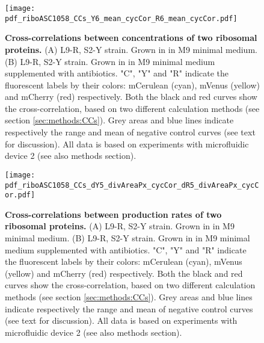 

\begin{figure}
    \centering
    \texttt{[image: pdf\_riboASC1058\_CCs\_Y6\_mean\_cycCor\_R6\_mean\_cycCor.pdf]}
    \caption{ 
        \textbf{Cross-correlations between concentrations of two ribosomal proteins.}
        (A) L9-R, S2-Y strain. Grown in in M9 minimal medium.
        (B) L9-R, S2-Y strain. Grown in in M9 minimal medium supplemented with antibiotics.
        "C", "Y" and "R" indicate the fluorescent labels by their colors: mCerulean (cyan), mVenus (yellow) and mCherry (red) respectively.
        Both the black and red curves show the cross-correlation, based on two different calculation methods (see section \ref{sec:methods:CCs}).
        Grey areas and blue lines indicate respectively the range and mean of negative control curves (see text for discussion).
        All data is based on experiments with microfluidic device 2 (see also methods section).
    }
    \label{fig:ribo:CCsEERiboribo}
\end{figure}

\begin{figure}
    \centering
    \texttt{[image: pdf\_riboASC1058\_CCs\_dY5\_divAreaPx\_cycCor\_dR5\_divAreaPx\_cycCor.pdf]}
    \caption{ 
        \textbf{Cross-correlations between production rates of two ribosomal proteins.}
        (A) L9-R, S2-Y strain. Grown in in M9 minimal medium.
        (B) L9-R, S2-Y strain. Grown in in M9 minimal medium supplemented with antibiotics.
        "C", "Y" and "R" indicate the fluorescent labels by their colors: mCerulean (cyan), mVenus (yellow) and mCherry (red) respectively.
        Both the black and red curves show the cross-correlation, based on two different calculation methods (see section \ref{sec:methods:CCs}).
        Grey areas and blue lines indicate respectively the range and mean of negative control curves (see text for discussion).
        All data is based on experiments with microfluidic device 2 (see also methods section).
    }
    \label{fig:ribo:CCsPPRiboribo}
\end{figure}




